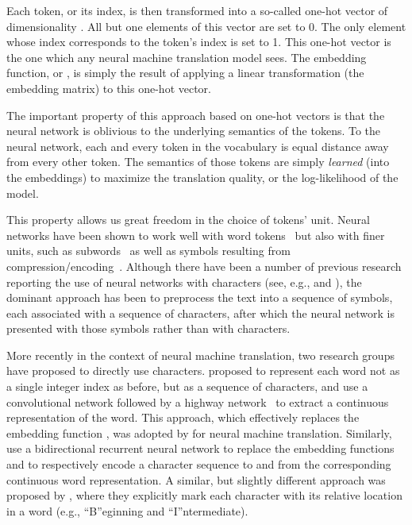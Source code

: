 \documentclass[11pt]{article}
\begin{document}
Each token, or its index, is then transformed into a so-called one-hot vector of
dimensionality .  All but one elements of this vector are set to 0. The
only element whose index corresponds to the token's index is set to 1. This
one-hot vector is the one which any neural machine translation model sees. The
embedding function,  or , is simply the result of applying a linear transformation
(the embedding matrix) to this one-hot vector.

The important property of this approach based on one-hot vectors is that the
neural network is oblivious to the underlying semantics of the tokens. To the
neural network, each and every token in the vocabulary is equal distance away
from every other token. The semantics of those tokens are simply {\em learned}
(into the embeddings) to maximize the translation quality, or the log-likelihood of the model.

This property allows us great freedom in the choice of tokens' unit. Neural
networks have been shown to work well with word tokens~\cite{bengio2001neural,schwenk2007continuous,mikolov2010recurrent}
but also with finer units, such as
subwords~\cite{sennrich2015neural,botha2014compositional,luong2013better} as well as
symbols resulting from compression/encoding~\cite{chitnis2015variable}. Although
there have been a number of previous research reporting the use of neural
networks with characters (see, e.g.,  and ),
the dominant approach has been to preprocess the text into a sequence of symbols, each associated
with a sequence of characters,
after which the neural network is presented with those symbols rather than
with characters.

More recently in the context of neural machine translation, two research groups
have proposed to directly use characters.  proposed to
represent each word not as a single integer index as before, but as a sequence
of characters, and use a convolutional network followed by a highway network~\cite{srivastava2015training} to
extract a continuous representation of the word. This approach, which
effectively replaces the embedding function , was adopted by
 for neural machine translation. Similarly,
 use a bidirectional recurrent neural network to
replace the embedding functions  and  to respectively encode a
character sequence to and from the corresponding continuous word representation.
A similar, but slightly different approach was proposed by 
, where they
explicitly mark each character with its relative location in a word (e.g., ``B''eginning
and ``I''ntermediate). 
\end{document}
